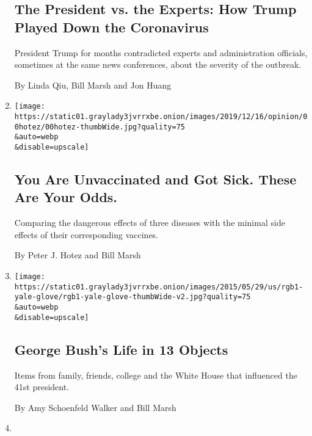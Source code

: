 \begin{enumerate}
  \hypertarget{the-president-vs-the-experts-how-trump-played-down-the-coronavirus}{%
  \subsection{The President vs. the Experts: How Trump Played Down the
  Coronavirus}\label{the-president-vs-the-experts-how-trump-played-down-the-coronavirus}}

  President Trump for months contradicted experts and administration
  officials, sometimes at the same news conferences, about the severity
  of the outbreak.

  By Linda Qiu, Bill Marsh and Jon Huang
\item
  \href{/2020/01/09/opinion/vaccine-hesitancy.html}{}

  \texttt{[image: https://static01.graylady3jvrrxbe.onion/images/2019/12/16/opinion/00hotez/00hotez-thumbWide.jpg?quality=75\\\&auto=webp\\\&disable=upscale]}

  \hypertarget{you-are-unvaccinated-and-got-sick-these-are-your-odds}{%
  \subsection{You Are Unvaccinated and Got Sick. These Are Your
  Odds.}\label{you-are-unvaccinated-and-got-sick-these-are-your-odds}}

  Comparing the dangerous effects of three diseases with the minimal
  side effects of their corresponding vaccines.

  By Peter J. Hotez and Bill Marsh
\item
  \href{/2018/12/01/obituaries/george-bushs-life-in-13-objects.html}{}

  \texttt{[image: https://static01.graylady3jvrrxbe.onion/images/2015/05/29/us/rgb1-yale-glove/rgb1-yale-glove-thumbWide-v2.jpg?quality=75\\\&auto=webp\\\&disable=upscale]}

  \hypertarget{george-bushs-life-in-13-objects}{%
  \subsection{George Bush's Life in 13
  Objects}\label{george-bushs-life-in-13-objects}}

  Items from family, friends, college and the White House that
  influenced the 41st president.

  By Amy Schoenfeld Walker and Bill Marsh
\item
  \href{/interactive/2017/09/19/world/americas/mexico-earthquake-map-photos.html}{}


\end{enumerate}
